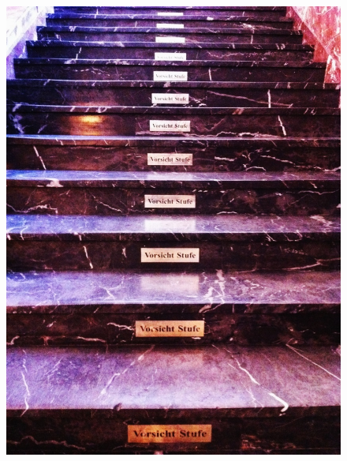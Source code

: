 \begin{frame}
\begin{figure}
\begin{minipage}[t]{0.45\textwidth}
\includegraphics[width=\textwidth]{material/15Prag3}
\end{minipage}

\end{figure}

\end{frame}

